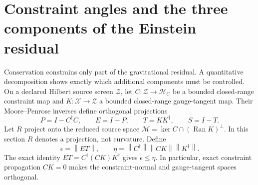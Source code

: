 \documentclass[11pt,a4paper,oneside]{book}
\theoremstyle{plain}
\theoremstyle{definition}
\theoremstyle{remark}
\newcommand{\Ran}{\operatorname{Ran}}
\newcommand{\norm}[1]{\left\lVert#1\right\rVert}
\begin{document}
\section{Constraint angles and the three components of the Einstein residual}
\label{sec:constraint-angle}
Conservation constrains only part of the gravitational residual.  A
quantitative decomposition shows exactly which additional components
must be controlled.  On a declared Hilbert source screen $\mathcal Z$,
let $C:\mathcal Z\to\mathcal H_C$ be a bounded closed-range constraint
map and $K:\mathcal X\to\mathcal Z$ a bounded closed-range gauge-tangent
map.  Their Moore--Penrose inverses define orthogonal projections
\begin{equation}
 P=I-C^\dagger C,\qquad E=I-P,\qquad
 T=KK^\dagger,\qquad S=I-T.
 \label{eq:constraint-projections}
\end{equation}
Let $R$ project onto the reduced source space
$\mathcal M=\ker C\cap(\Ran K)^\perp$.  In this section $R$ denotes a
projection, not curvature.  Define
\begin{equation}
 \epsilon=\norm{ET},\qquad
 \eta=\norm{C^\dagger}\norm{CK}\norm{K^\dagger}.
 \label{eq:constraint-angle}
\end{equation}
The exact identity $ET=C^\dagger(CK)K^\dagger$ gives
$\epsilon\le\eta$.  In particular, exact constraint propagation
$CK=0$ makes the constraint-normal and gauge-tangent spaces orthogonal.
\end{document}
